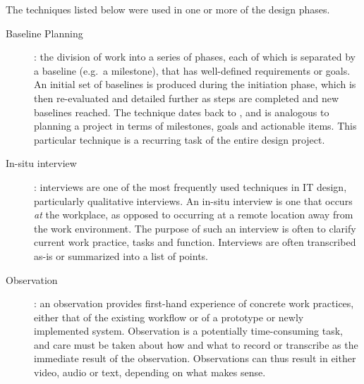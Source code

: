 The techniques listed below were used in one or more of the design phases.
\begin{description}
    \item [Baseline Planning]: the division of work into a series of phases,
        each of which is separated by a baseline (e.g.\ a milestone), that has well-defined
        requirements or goals. An initial set of baselines is produced during the initiation
        phase, which is then re-evaluated and detailed further as steps are completed and new
        baselines reached. The technique dates back to \cite{andersen1990professional}, and is
        analogous to planning a project in terms of milestones, goals and actionable items. This
        particular technique is a recurring task of the entire design project.

    \item [In-situ interview]: interviews are one of the most frequently used techniques in IT 
        design, particularly qualitative interviews\cite{bodker2004participatory}. An in-situ
        interview is one that occurs \textit{at} the workplace, as opposed to occurring at a
        remote location away from the work environment. The purpose of such an interview is often
        to clarify current work practice, tasks and function. Interviews are often transcribed as-is
        or summarized into a list of points.

    \item [Observation]: an observation provides first-hand experience of concrete work practices,
        either that of the existing workflow or of a prototype or newly implemented system. Observation
        is a potentially time-consuming task, and care must be taken about how and what to record or transcribe
        as the immediate result of the observation. Observations can thus result in either video, audio or text,
        depending on what makes sense.


\end{description}
